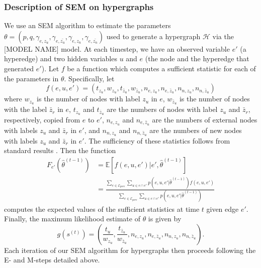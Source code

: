 \documentclass[aps,pre,reprint,superscriptaddress,nofootinbib]{revtex4-2}
\begin{document}
\subsubsection{Description of SEM on hypergraphs}
We use an SEM algorithm to estimate the parameters $\theta = (p, q, \gamma_{e, z_u}, \gamma_{e, \bar{z_u}}, \gamma_{e, z_n}, \gamma_{e, \bar{z_n}})$ used to generate a hypergraph $\mathcal{H}$ via the [MODEL NAME] model. At each timestep, we have an observed variable $e'$ (a hyperedge) and two hidden variables $u$ and $e$ (the node and the hyperedge that generated $e'$). Let $f$ be a function which computes a sufficient statistic for each of the parameters in $\theta$. Specifically, let
\begin{equation*}
    f(e, u, e') = (t_{z_u}, w_{z_u}, t_{\bar{z}_u}, w_{\bar{z}_u}, n_{e, z_u}, n_{e, \bar{z}_u}, n_{n, z_u}, n_{n, \bar{z}_u})
\end{equation*}
where $w_{z_u}$ is the number of nodes with label  $z_u$ in $e$, $w_{\bar{z}_u}$ is the number of nodes with the label $\bar{z}_r$ in $e$, $t_{z_u}$ and $t_{\bar{z}_u}$ are the numbers of nodes with label $z_u$ and $\bar{z}_r$, respectively, copied from $e$ to $e'$, $n_{e, z_u}$ and ${n_{e, \bar{z}_u}}$ are the numbers of external nodes with labels $z_u$ and $\bar{z}_r$ in $e'$, and $n_{n, z_u}$ and ${n_{n, \bar{z}_u}}$ are the numbers of new nodes with labels $z_u$ and $\bar{z}_r$ in $e'$. The sufficiency of these statistics follows from standard results \cite{rice2007mathematical}. Then the function \begin{equation*}
\begin{split}
    F_{e'}(\hat{\theta}^{(t - 1)}) &= \mathbb{E}[f(e, u, e') | e', \hat{\theta}^{(t - 1)}] \\
    &= \frac{\sum_{e \in \mathcal{E}_{\text{prev}}} \sum_{u \in e \cap e'} p(e, u, e' | \hat{\theta}^{(t - 1)}) f(e, u, e')}{\sum_{e \in \mathcal{E}_{\text{prev}}} \sum_{u \in e \cap e'} p(e, u, e' | \hat{\theta}^{(t - 1)}) } 
\end{split}
\end{equation*}
computes the expected values of the sufficient statistics at time $t$ given edge $e'$. Finally, the maximum likelihood estimate of $\theta$ is given by
\begin{equation*}
    g(s^{(t)}) = \left ( \frac{t_u}{w_{z_u}}, \frac{t_{\bar{z}_u}}{w_{\bar{z}_u}}, n_{e, z_u}, n_{e, \bar{z}_u}, n_{n, z_u}, n_{n, \bar{z}_u} \right).
\end{equation*}
Each iteration of our SEM algorithm for hypergraphs then proceeds following the E- and M-steps detailed above.
\end{document}

